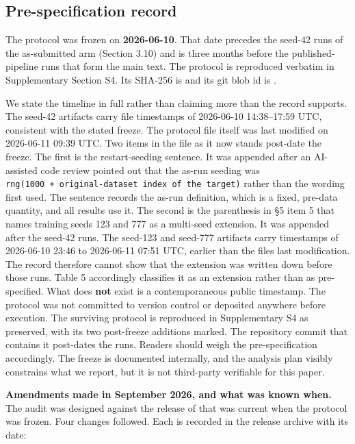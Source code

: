 \documentclass[11pt,a4paper]{article}
\begin{document}
\subsection{Pre-specification record}\label{sec:2.7}

The protocol was frozen on \textbf{2026-06-10}. That date precedes the seed-42 runs of the
as-submitted arm (Section 3.10) and is three months before the published-pipeline runs
that form the main text. The protocol is reproduced verbatim in Supplementary Section S4.
Its SHA-256 is \texttt{} and its
git blob id is \texttt{}.

We state the timeline in full rather than claiming more than the record supports. The
seed-42 artifacts carry file timestamps of 2026-06-10 14:38--17:59 UTC, consistent with the
stated freeze. The protocol file itself was last modified on 2026-06-11 09:39 UTC. Two
items in the file as it now stands post-date the freeze. The first is the restart-seeding
sentence. It was appended after an AI-assisted code review pointed out that the as-run
seeding was \texttt{rng(1000\ +\ original-dataset\ index\ of\ the\ target)} rather than the wording
first used. The sentence records the as-run definition, which is a fixed, pre-data
quantity, and all results use it. The second is the parenthesis in \S{}5 item 5 that names
training seeds 123 and 777 as a multi-seed extension. It was appended after the seed-42
runs. The seed-123 and seed-777 artifacts carry timestamps of
2026-06-10 23:46 to 2026-06-11 07:51 UTC, earlier than the file\textquotesingle s last modification. The
record therefore cannot show that the extension was written down before those runs.
Table 5 accordingly classifies it as an extension rather than as pre-specified. What does
\textbf{not} exist is a contemporaneous public timestamp. The protocol was not committed to
version control or deposited anywhere before execution. The surviving protocol is
reproduced in Supplementary S4 as preserved, with its two post-freeze additions marked.
The repository commit that contains it post-dates the runs. Readers should weigh the
pre-specification accordingly. The freeze is documented internally, and the analysis plan
visibly constrains what we report, but it is not third-party verifiable for this paper.

\textbf{Amendments made in September 2026, and what was known when.} The audit was designed
against the release of \cite{choi20261} that was current when the protocol was frozen. Four changes
followed. Each is recorded in the release archive with its date:
\end{document}
